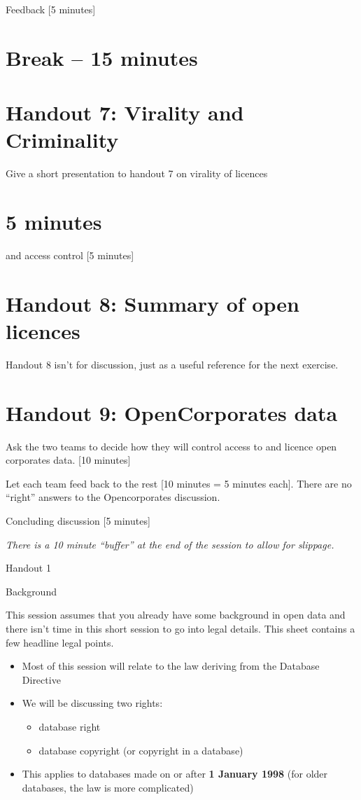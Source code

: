 Feedback {[}5 minutes{]}

\section{Break -- 15 minutes}

\section{Handout 7: Virality and Criminality}

Give a short presentation to handout 7 on virality of licences \section{5
minutes} and access control {[}5 minutes{]}

\section{Handout 8: Summary of open licences}

Handout 8 isn't for discussion, just as a useful reference for the next
exercise.

\section{Handout 9: OpenCorporates data}

Ask the two teams to decide how they will control access to and licence
open corporates data. {[}10 minutes{]}

Let each team feed back to the rest {[}10 minutes = 5 minutes each{]}.
There are no ``right'' answers to the Opencorporates discussion.

Concluding discussion {[}5 minutes{]}

\emph{There is a 10 minute ``buffer'' at the end of the session to allow
for slippage.}

Handout 1

Background

This session assumes that you already have some background in open data
and there isn't time in this short session to go into legal details.
This sheet contains a few headline legal points.

\begin{itemize}
\item
  Most of this session will relate to the law deriving from the Database
  Directive
\item
  We will be discussing two rights:

  \begin{itemize}
  \item
    database right
  \item
    database copyright (or copyright in a database)
  \end{itemize}
\item
  This applies to databases made on or after \textbf{1 January 1998}
  (for older databases, the law is more complicated)
\end{itemize}

